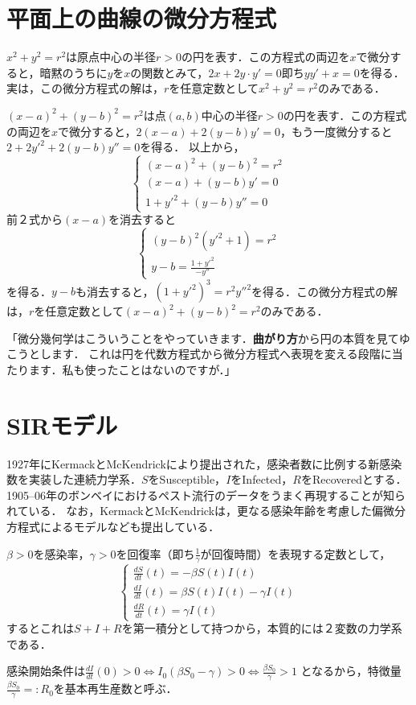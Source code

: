 \documentclass[uplatex,dvipdfmx]{jsreport}
\begin{document}
\section{平面上の曲線の微分方程式}

$x^2+y^2=r^2$は原点中心の半径$r>0$の円を表す．この方程式の両辺を$x$で微分すると，暗黙のうちに$y$を$x$の関数とみて，$2x+2y\cdot y'=0$即ち$yy'+x=0$を得る．
実は，この微分方程式の解は，$r$を任意定数として$x^2+y^2=r^2$のみである．

$(x-a)^2+(y-b)^2=r^2$は点$(a,b)$中心の半径$r>0$の円を表す．この方程式の両辺を$x$で微分すると，$2(x-a)+2(y-b)y'=0$，もう一度微分すると$2+2y'^2+2(y-b)y''=0$を得る．
以上から，
\[\begin{cases}
    (x-a)^2+(y-b)^2=r^2\\
    (x-a)+(y-b)y'=0\\
    1+y'^2+(y-b)y''=0
\end{cases}\]
前２式から$(x-a)$を消去すると
\[\begin{cases}
    (y-b)^2(y'^2+1)=r^2\\
    y-b=\frac{1+y'^2}{-y''}
\end{cases}\]
を得る．$y-b$も消去すると，$(1+y'^2)^3=r^2y''^2$を得る．この微分方程式の解は，$r$を任意定数として$(x-a)^2+(y-b)^2=r^2$のみである．

\begin{screen}
    「微分幾何学はこういうことをやっていきます．\textbf{曲がり方}から円の本質を見てゆこうとします．
    これは円を代数方程式から微分方程式へ表現を変える段階に当たります．私も使ったことはないのですが．」
\end{screen}

\section{SIRモデル}
1927年にKermackとMcKendrickにより提出された\cite{SIRモデル}，感染者数に比例する新感染数を実装した連続力学系．$S$をSusceptible，$I$をInfected，$R$をRecoveredとする．
1905–06年のボンベイにおけるペスト流行のデータをうまく再現することが知られている．
なお，KermackとMcKendrickは，更なる感染年齢を考慮した偏微分方程式によるモデルなども提出している．

\begin{theory}$\beta>0$を感染率，$\gamma>0$を回復率（即ち$\frac{1}{\gamma}$が回復時間）を表現する定数として，
    \[\begin{cases}
        \frac{dS}{dt}(t) = -\beta S(t)I(t)\\
        \frac{dI}{dt}(t) = \beta S(t)I(t) - \gamma I(t)\\
        \frac{dR}{dt}(t) = \gamma I(t)
    \end{cases}\]
    するとこれは$S+I+R$を第一積分として持つから，本質的には２変数の力学系である．

    感染開始条件は$\frac{dI}{dt}(0)>0\Leftrightarrow I_0(\beta S_0-\gamma)>0\Leftrightarrow\frac{\beta S_0}{\gamma}>1$
    となるから，特徴量$\frac{\beta S_0}{\gamma}=:R_0$を基本再生産数と呼ぶ．
\end{theory}
\end{document}
